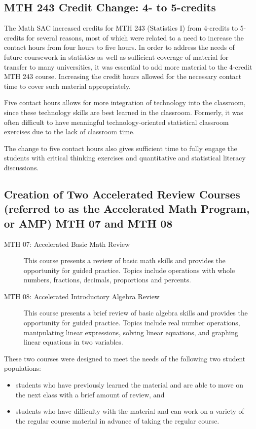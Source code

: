 \subsection{MTH 243 Credit Change: 4- to 5-credits}
The Math SAC increased credits for MTH 243 (Statistics I) from 4-credits to
5-credits for several reasons, most of which were related to a need to increase
the contact hours from four hours to five hours.  In order to address the needs
of future coursework in statistics as well as sufficient coverage of material
for transfer to many universities, it was essential to add more material to the
4-credit MTH 243 course.  Increasing the credit hours allowed for the necessary
contact time to cover such material appropriately.
 
 
Five contact hours allows for more integration of technology into the classroom,
since these technology skills are best learned in the classroom. Formerly, it
was often difficult to have meaningful technology-oriented statistical classroom
exercises due to the lack of classroom time.
 
The change to five contact hours also gives sufficient time to fully engage the
students with critical thinking exercises and quantitative and statistical
literacy discussions.

\subsection[Creation of AMP/MTH008]{Creation of Two Accelerated Review Courses
(referred to as the Accelerated Math Program, or AMP) MTH 07 and MTH 08}
 
\begin{description}
\item[MTH 07: Accelerated Basic Math Review]  This course presents a review of
  basic math skills and provides the opportunity for guided practice.  Topics
  include operations with whole numbers, fractions, decimals, proportions and
  percents.

\item[MTH 08: Accelerated Introductory Algebra Review] This course presents a
  brief review of basic algebra skills and provides the opportunity for guided
  practice.  Topics include real number operations, manipulating linear
  expressions, solving linear equations, and graphing linear equations in two
  variables.
\end{description}

These two courses were designed to meet the needs of the following two student
populations:
\begin{itemize}
\item students who have previously learned the material and are able to move on
  the next class with a brief amount of review, and
\item students who have difficulty with the material and can work on a variety
  of the regular course material in advance of taking the regular course.
\end{itemize}

